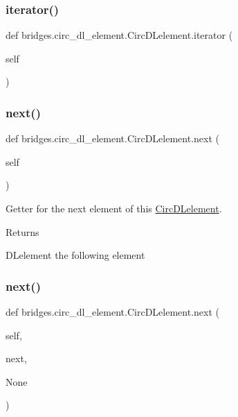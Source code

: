 \subsubsection{\texorpdfstring{iterator()}{iterator()}}
{\footnotesize\ttfamily def bridges.\+circ\+\_\+dl\+\_\+element.\+Circ\+D\+Lelement.\+iterator (\begin{DoxyParamCaption}\item[{}]{self }\end{DoxyParamCaption})}

\mbox{\label{classbridges_1_1circ__dl__element_1_1_circ_d_lelement_a09b8b12344743709cce1d5fd926b88e9}} 
\subsubsection{\texorpdfstring{next()}{next()}\hspace{0.1cm}{\footnotesize\ttfamily [1/2]}}
{\footnotesize\ttfamily def bridges.\+circ\+\_\+dl\+\_\+element.\+Circ\+D\+Lelement.\+next (\begin{DoxyParamCaption}\item[{}]{self }\end{DoxyParamCaption})}



Getter for the next element of this \hyperlink{classbridges_1_1circ__dl__element_1_1_circ_d_lelement}{Circ\+D\+Lelement}. 

\begin{DoxyReturn}{Returns}


D\+Lelement the following element 
\end{DoxyReturn}
\mbox{\label{classbridges_1_1circ__dl__element_1_1_circ_d_lelement_a842efa9c0ad878fe34b343600a23d9aa}} 
\subsubsection{\texorpdfstring{next()}{next()}\hspace{0.1cm}{\footnotesize\ttfamily [2/2]}}
{\footnotesize\ttfamily def bridges.\+circ\+\_\+dl\+\_\+element.\+Circ\+D\+Lelement.\+next (\begin{DoxyParamCaption}\item[{}]{self,  }\item[{}]{next,  }\item[{}]{None }\end{DoxyParamCaption})}



